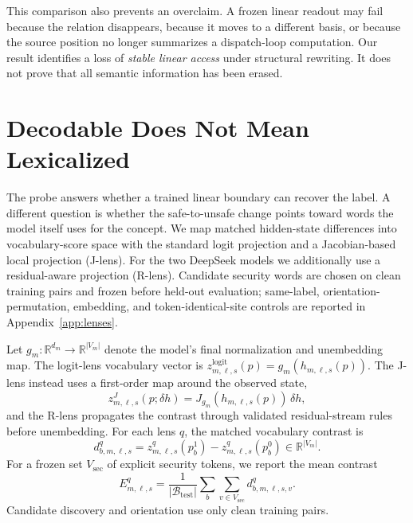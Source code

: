 \documentclass{article}
\begin{document}
This comparison also prevents an overclaim. A frozen linear readout may fail because the relation disappears, because it moves to a different basis, or because the source position no longer summarizes a dispatch-loop computation. Our result identifies a loss of \emph{stable linear access} under structural rewriting. It does not prove that all semantic information has been erased.

\section{Decodable Does Not Mean Lexicalized}
The probe answers whether a trained linear boundary can recover the label. A different question is whether the safe-to-unsafe change points toward words the model itself uses for the concept. We map matched hidden-state differences into vocabulary-score space with the standard logit projection and a Jacobian-based local projection (J-lens). For the two DeepSeek models we additionally use a residual-aware projection (R-lens). Candidate security words are chosen on clean training pairs and frozen before held-out evaluation; same-label, orientation-permutation, embedding, and token-identical-site controls are reported in Appendix~\ref{app:lenses}.

Let $g_m:\mathbb{R}^{d_m}\rightarrow\mathbb{R}^{|V_m|}$ denote the model's
final normalization and unembedding map. The logit-lens vocabulary vector is
$z_{m,\ell,s}^{\mathrm{logit}}(p)=g_m(h_{m,\ell,s}(p))$. The J-lens instead
uses a first-order map around the observed state,
\begin{equation}
 z_{m,\ell,s}^{J}(p;\delta h)=
 J_{g_m}(h_{m,\ell,s}(p))\,\delta h,
 \label{eq:jlens}
\end{equation}
and the R-lens propagates the contrast through validated residual-stream rules
before unembedding. For each lens $q$, the matched vocabulary contrast is
\begin{equation}
 d_{b,m,\ell,s}^{q}=z_{m,\ell,s}^{q}(p_b^1)-
 z_{m,\ell,s}^{q}(p_b^0)\in\mathbb{R}^{|V_m|}.
 \label{eq:vocabdiff}
\end{equation}
For a frozen set $V_{\mathrm{sec}}$ of explicit security tokens, we report
the mean contrast
\begin{equation}
 E_{m,\ell,s}^{q}=\frac{1}{|\mathcal{B}_{\mathrm{test}}|}
 \sum_b\sum_{v\in V_{\mathrm{sec}}}d_{b,m,\ell,s,v}^{q}.
 \label{eq:explicit}
\end{equation}
Candidate discovery and orientation use only clean training pairs.
\end{document}
